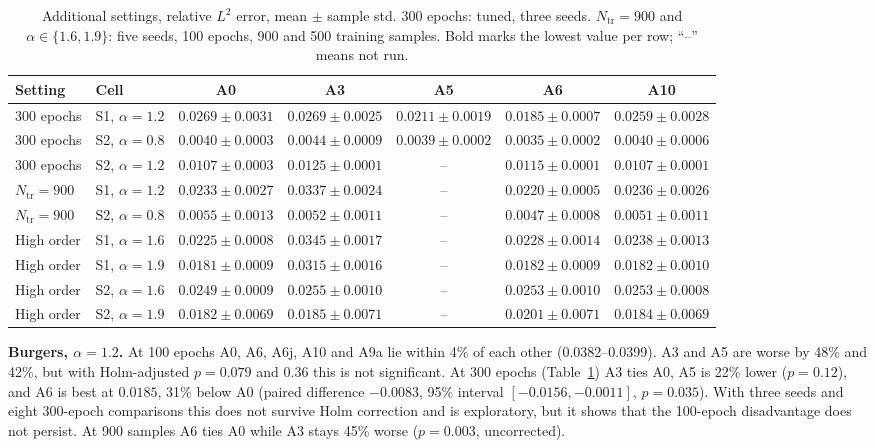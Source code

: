 \documentclass[conference]{IEEEtran}
\begin{document}
\begin{table}[t]
\centering
\scriptsize
\setlength{\tabcolsep}{5pt}
\caption{Additional settings, relative $L^2$ error, mean $\pm$ sample std. 300 epochs: tuned, three seeds. $N_{\mathrm{tr}}=900$ and $\alpha\in\{1.6,1.9\}$: five seeds, 100 epochs, 900 and 500 training samples. Bold marks the lowest value per row; ``--'' means not run.}
\label{tab:extra}
\begin{tabular}{llccccc}
\toprule
Setting & Cell & A0 & A3 & A5 & A6 & A10 \\
\midrule
300 epochs & S1, $\alpha{=}1.2$ & $0.0269\pm0.0031$ & $0.0269\pm0.0025$ & $0.0211\pm0.0019$ & $\mathbf{0.0185\pm0.0007}$ & $0.0259\pm0.0028$ \\
300 epochs & S2, $\alpha{=}0.8$ & $0.0040\pm0.0003$ & $0.0044\pm0.0009$ & $0.0039\pm0.0002$ & $\mathbf{0.0035\pm0.0002}$ & $0.0040\pm0.0006$ \\
300 epochs & S2, $\alpha{=}1.2$ & $0.0107\pm0.0003$ & $0.0125\pm0.0001$ & -- & $0.0115\pm0.0001$ & $\mathbf{0.0107\pm0.0001}$ \\
$N_{\mathrm{tr}}{=}900$ & S1, $\alpha{=}1.2$ & $0.0233\pm0.0027$ & $0.0337\pm0.0024$ & -- & $\mathbf{0.0220\pm0.0005}$ & $0.0236\pm0.0026$ \\
$N_{\mathrm{tr}}{=}900$ & S2, $\alpha{=}0.8$ & $0.0055\pm0.0013$ & $0.0052\pm0.0011$ & -- & $\mathbf{0.0047\pm0.0008}$ & $0.0051\pm0.0011$ \\
High order & S1, $\alpha{=}1.6$ & $\mathbf{0.0225\pm0.0008}$ & $0.0345\pm0.0017$ & -- & $0.0228\pm0.0014$ & $0.0238\pm0.0013$ \\
High order & S1, $\alpha{=}1.9$ & $\mathbf{0.0181\pm0.0009}$ & $0.0315\pm0.0016$ & -- & $0.0182\pm0.0009$ & $0.0182\pm0.0010$ \\
High order & S2, $\alpha{=}1.6$ & $\mathbf{0.0249\pm0.0009}$ & $0.0255\pm0.0010$ & -- & $0.0253\pm0.0010$ & $0.0253\pm0.0008$ \\
High order & S2, $\alpha{=}1.9$ & $\mathbf{0.0182\pm0.0069}$ & $0.0185\pm0.0071$ & -- & $0.0201\pm0.0071$ & $0.0184\pm0.0069$ \\
\bottomrule
\end{tabular}
\end{table}

\textbf{Burgers, $\alpha=1.2$.} At 100 epochs A0, A6, A6j, A10 and A9a lie within 4\% of each other (0.0382--0.0399). A3 and A5 are worse by 48\% and 42\%, but with Holm-adjusted $p=0.079$ and $0.36$ this is not significant. At 300 epochs (Table~\ref{tab:extra}) A3 ties A0, A5 is 22\% lower ($p=0.12$), and A6 is best at $0.0185$, 31\% below A0 (paired difference $-0.0083$, 95\% interval $[-0.0156,-0.0011]$, $p=0.035$). With three seeds and eight 300-epoch comparisons this does not survive Holm correction and is exploratory, but it shows that the 100-epoch disadvantage does not persist. At 900 samples A6 ties A0 while A3 stays 45\% worse ($p=0.003$, uncorrected).
\end{document}
